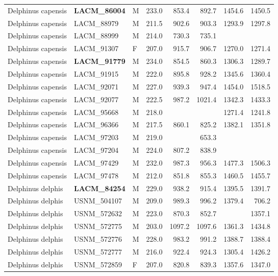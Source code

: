 \begin{table}[ht]
\begin{tabular}{lllrrrrr}
  Delphinus capensis & \textbf{ LACM\_86004 } & M & 233.0 & 853.4 & 892.7 & 1454.6 & 1450.5 \\ 
  Delphinus capensis & LACM\_88979 & M & 211.5 & 902.6 & 903.3 & 1293.9 & 1297.8 \\ 
  Delphinus capensis & LACM\_88999 & M & 214.0 & 730.3 & 735.1 &  &  \\ 
  Delphinus capensis & LACM\_91307 & F & 207.0 & 915.7 & 906.7 & 1270.0 & 1271.4 \\ 
  Delphinus capensis & \textbf{ LACM\_91779 } & M & 234.0 & 854.5 & 860.3 & 1306.3 & 1289.7 \\ 
  Delphinus capensis & LACM\_91915 & M & 222.0 & 895.8 & 928.2 & 1345.6 & 1360.4 \\ 
  Delphinus capensis & LACM\_92071 & M & 227.0 & 939.3 & 947.4 & 1454.0 & 1518.5 \\ 
  Delphinus capensis & LACM\_92077 & M & 222.5 & 987.2 & 1021.4 & 1342.3 & 1433.3 \\ 
  Delphinus capensis & LACM\_95668 & M & 218.0 &  &  & 1271.4 & 1241.8 \\ 
  Delphinus capensis & LACM\_96366 & M & 217.5 & 860.1 & 825.2 & 1382.1 & 1351.8 \\ 
  Delphinus capensis & LACM\_97203 & M & 219.0 &  & 653.3 &  &  \\ 
  Delphinus capensis & LACM\_97204 & M & 224.0 & 807.2 & 838.9 &  &  \\ 
  Delphinus capensis & LACM\_97429 & M & 232.0 & 987.3 & 956.3 & 1477.3 & 1506.3 \\ 
  Delphinus capensis & LACM\_97478 & M & 212.0 & 851.8 & 855.3 & 1460.5 & 1455.7 \\ 
  Delphinus delphis & \textbf{ LACM\_84254 } & M & 229.0 & 938.2 & 915.4 & 1395.5 & 1391.7 \\ 
  Delphinus delphis & USNM\_504107 & M & 209.0 & 989.3 & 996.2 & 1379.4 & 706.2 \\ 
  Delphinus delphis & USNM\_572632 & M & 223.0 & 870.3 & 852.7 &  & 1357.1 \\ 
  Delphinus delphis & USNM\_572775 & M & 203.0 & 1097.2 & 1097.6 & 1361.3 & 1434.8 \\ 
  Delphinus delphis & USNM\_572776 & M & 228.0 & 983.2 & 991.2 & 1388.7 & 1388.4 \\ 
  Delphinus delphis & USNM\_572777 & M & 216.0 & 922.4 & 924.3 & 1305.4 & 1426.2 \\ 
  Delphinus delphis & USNM\_572859 & F & 207.0 & 820.8 & 839.3 & 1357.6 & 1347.0 \\ 

\end{tabular}
\end{table}

